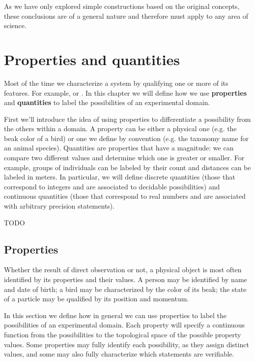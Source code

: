 \documentclass[11pt,letterpaper,fleqn]{memoir} %
\begin{document}
As we have only explored simple constructions based on the original concepts, these conclusions are of a general nature and therefore must apply to any area of science. 

\chapter{Properties and quantities}

Most of the time we characterize a system by qualifying one or more of its features. For example,  or . In this chapter we will define how we use \textbf{properties} and \textbf{quantities} to label the possibilities of an experimental domain.

First we'll introduce the idea of using properties to differentiate a possibility from the others within a domain. A property can be either a physical one (e.g. the beak color of a bird) or one we define by convention (e.g. the taxonomy name for an animal species). Quantities are properties that have a magnitude: we can compare two different values and determine which one is greater or smaller. For example, groups of individuals can be labeled by their count and distances can be labeled in meters. In particular, we will define discrete quantities (those that correspond to integers and are associated to decidable possibilities) and continuous quantities (those that correspond to real numbers and are associated with arbitrary precision statements).

TODO

\section{Properties}

Whether the result of direct observation or not, a physical object is most often identified by its properties and their values. A person may be identified by name and date of birth; a bird may be characterized by the color of its beak; the state of a particle may be qualified by its position and momentum.

In this section we define how in general we can use properties to label the possibilities of an experimental domain. Each property will specify a continuous function from the possibilities to the topological space of the possible property values. Some properties may fully identify each possibility, as they assign distinct values, and some may also fully characterize which statements are verifiable.
\end{document}
